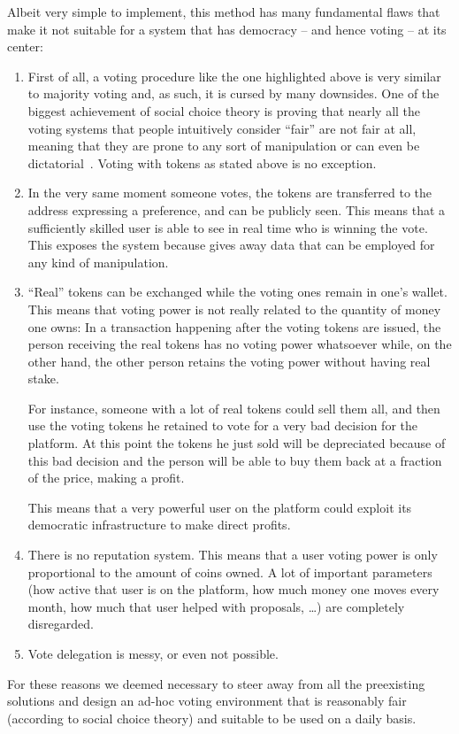 \documentclass[submission, copyright,creativecommons,sharealike,noncommercial]{eptcs}
\begin{document}
	Albeit very simple to implement, this method has many fundamental flaws that make it not suitable for a system that has democracy -- and hence voting -- at its center:
	\begin{enumerate}	
		\item First of all, a voting procedure like the one highlighted above is very similar to majority voting and, as such, it is cursed by many downsides. One of the biggest achievement of social choice theory is proving that nearly all the voting systems that people intuitively consider ``fair'' are not fair at all, meaning that they are prone to any sort of manipulation or can even be dictatorial~\cite{Arrow1951, Satterthwaite1975, Gibbard1973}. Voting with tokens as stated above is no exception. 
		\item In the very same moment someone votes, the tokens are transferred to the address expressing a preference, and can be publicly seen. This means that a sufficiently skilled user is able to see in real time who is winning the vote. This exposes the system because gives away data that can be employed for any kind of manipulation.
		\item ``Real'' tokens can be exchanged while the voting ones remain in one's wallet. This means that voting power is not really related to the quantity of money one owns: In a transaction happening after the voting tokens are issued, the person receiving the real tokens has no voting power whatsoever while, on the other hand, the other person retains the voting power without having real stake.
		
		For instance, someone with a lot of real tokens could sell them all, and then use the voting tokens he retained to vote for a very bad decision for the platform. At this point the tokens he just sold will be depreciated because of this bad decision and the person will be able to buy them back at a fraction of the price, making a profit. 
		
		This means that a very powerful user on the platform could exploit its democratic infrastructure to make direct profits.
		\item There is no reputation system. This means that a user voting power is only proportional to the amount of coins owned. A lot of important parameters (how active that user is on the platform, how much money one moves every month, how much that user helped with proposals, \dots) are completely disregarded.
		\item Vote delegation is messy, or even not possible.
	\end{enumerate}
%
	For these reasons we deemed necessary to steer away from all the preexisting solutions and design an ad-hoc voting environment that is reasonably fair (according to social choice theory) and suitable to be used on a daily basis.
%
%
\end{document}
